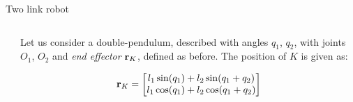 \documentclass{beamer}
\begin{document}
\begin{frame}{Two link robot}
	\begin{flushleft}
		
	
		\begin{columns}
			\begin{column}{0.4\textwidth}
				
			\end{column}
			\begin{column}{0.6\textwidth}  %
				
					Let us consider a double-pendulum, described with angles $q_1$, $q_2$, with joints $O_1$, $O_2$ and \emph{end effector} $\mathbf{r}_K$, defined as before. The position of $K$ is given as:
				
					
					\begin{equation*}
						\mathbf{r}_K = \begin{bmatrix}
							l_1 \sin (q_1) + l_2 \sin (q_1+q_2) \\ 
							l_1 \cos (q_1) + l_2 \cos (q_1+q_2) 
						\end{bmatrix}
					\end{equation*}
				
			\end{column}
		\end{columns}
		
		
	\end{flushleft}
\end{frame}
\end{document}
